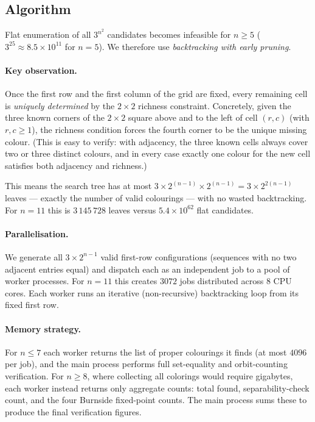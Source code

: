 \documentclass{article}
\begin{document}
\subsection{Algorithm}

Flat enumeration of all $3^{n^2}$ candidates becomes
infeasible for $n \ge 5$ ($3^{25}\approx 8.5\times10^{11}$
for $n=5$).  We therefore use \emph{backtracking with early
pruning}.

\paragraph{Key observation.}
Once the first row and the first column of the grid are
fixed, every remaining cell is \emph{uniquely determined}
by the $2\times 2$ richness constraint.  Concretely, given
the three known corners of the $2\times 2$ square above and
to the left of cell $(r,c)$ (with $r,c\ge 1$), the richness
condition forces the fourth corner to be the unique missing
colour.  (This is easy to verify: with adjacency, the three
known cells always cover two or three distinct colours, and
in every case exactly one colour for the new cell satisfies
both adjacency and richness.)

This means the search tree has at most
$3\times 2^{(n-1)}\times 2^{(n-1)} = 3\times 2^{2(n-1)}$
leaves --- exactly the number of valid colourings --- with
no wasted backtracking.  For $n=11$ this is $3\,145\,728$
leaves versus $5.4\times 10^{62}$ flat candidates.

\paragraph{Parallelisation.}
We generate all $3\times 2^{n-1}$ valid first-row
configurations (sequences with no two adjacent entries
equal) and dispatch each as an independent job to a pool of
worker processes.  For $n=11$ this creates $3072$ jobs
distributed across 8 CPU cores.  Each worker runs an
iterative (non-recursive) backtracking loop from its
fixed first row.

\paragraph{Memory strategy.}
For $n \le 7$ each worker returns the list of proper
colourings it finds (at most $4096$ per job), and the
main process performs full set-equality and orbit-counting
verification.  For $n \ge 8$, where collecting all colorings
would require gigabytes, each worker instead returns only
aggregate counts: total found, separability-check count, and
the four Burnside fixed-point counts.  The main process sums
these to produce the final verification figures.
\end{document}
